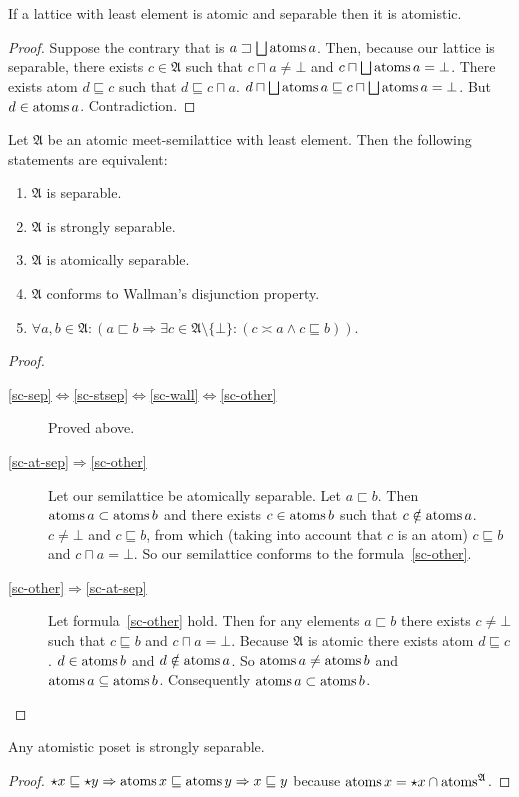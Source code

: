 \begin{thm}
\label{atomistic-enough}If a lattice with least element is atomic
and separable then it is atomistic.\end{thm}
\begin{proof}
Suppose the contrary that is $a\sqsupset\bigsqcup\atoms a$. Then,
because our lattice is separable, there exists $c\in\mathfrak{A}$
such that $c\sqcap a\neq\bot$ and $c\sqcap\bigsqcup\atoms a=\bot$.
There exists atom $d\sqsubseteq c$ such that $d\sqsubseteq c\sqcap a$.
$d\sqcap\bigsqcup\atoms a\sqsubseteq c\sqcap\bigsqcup\atoms a=\bot$.
But $d\in\operatorname{atoms} a$. Contradiction.\end{proof}
\begin{thm}
\label{sep-conds}Let $\mathfrak{A}$ be an atomic meet-semilattice
with least element. Then the following statements are equivalent:
\begin{enumerate}
\item \label{sc-sep}$\mathfrak{A}$ is separable.
\item \label{sc-stsep}$\mathfrak{A}$ is strongly separable.
\item \label{sc-at-sep}$\mathfrak{A}$ is atomically separable.
\item \label{sc-wall}$\mathfrak{A}$ conforms to Wallman's disjunction
property.
\item \label{sc-other}$\forall a,b\in\mathfrak{A}:(a\sqsubset b\Rightarrow\exists c\in\mathfrak{A}\setminus\{\bot\}:(c\asymp a\land c\sqsubseteq b))$.
\end{enumerate}
\end{thm}
\begin{proof}
~
\begin{description}
\item [{\ref{sc-sep}$\Leftrightarrow$\ref{sc-stsep}$\Leftrightarrow$\ref{sc-wall}$\Leftrightarrow$\ref{sc-other}}] Proved
above.
\item [{\ref{sc-at-sep}$\Rightarrow$\ref{sc-other}}] Let our semilattice
be atomically separable. Let $a\sqsubset b$. Then $\operatorname{atoms} a\subset\operatorname{atoms} b$
and there exists $c\in\operatorname{atoms} b$ such that $c\notin\operatorname{atoms} a$. $c\neq\bot$
and $c\sqsubseteq b$, from which (taking into account that $c$ is
an atom) $c\sqsubseteq b$ and $c\sqcap a=\bot$. So our semilattice
conforms to the formula~\ref{sc-other}.
\item [{\ref{sc-other}$\Rightarrow$\ref{sc-at-sep}}] Let formula~\ref{sc-other}
hold. Then for any elements $a\sqsubset b$ there exists $c\neq\bot$
such that $c\sqsubseteq b$ and $c\sqcap a=\bot$. Because $\mathfrak{A}$
is atomic there exists atom $d\sqsubseteq c$. $d\in\operatorname{atoms} b$ and
$d\notin\operatorname{atoms} a$. So $\operatorname{atoms} a\neq\operatorname{atoms} b$ and $\operatorname{atoms} a\subseteq\operatorname{atoms} b$.
Consequently $\operatorname{atoms} a\subset\operatorname{atoms} b$.
\end{description}
\end{proof}
\begin{thm}
\label{atom-is-sep}Any atomistic poset is strongly separable.\end{thm}
\begin{proof}
$\star x \sqsubseteq \star y \Rightarrow \operatorname{atoms} x \sqsubseteq
\operatorname{atoms} y \Rightarrow x \sqsubseteq y$ because $\operatorname{atoms} x = \star x
\cap \operatorname{atoms}^{\mathfrak{A}}$.
\end{proof}

